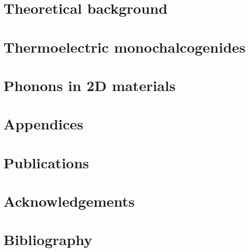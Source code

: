 \documentclass[
11pt, %
english, %
singlespacing, %
headsepline, %
]{MastersDoctoralThesis} %
\begin{document}


\part{Theoretical background}

 

 
\part{Thermoelectric monochalcogenides}



\part{Phonons in 2D materials}



\part*{Appendices}
\appendix %







\part*{Publications}



\part*{Acknowledgements}



\part*{Bibliography}
%
\printbibliography[heading=bibintoc]

\end{document}
